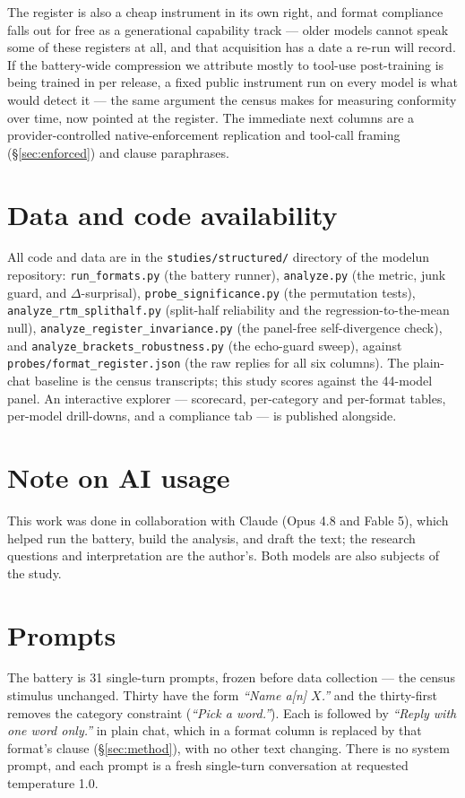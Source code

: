 \documentclass[11pt]{article}
\begin{document}
The register is also a cheap instrument in its own right, and format compliance falls out for free as a generational
capability track --- older models cannot speak some of these registers at all, and that
acquisition has a date a re-run will record. If the battery-wide compression we attribute mostly
to tool-use post-training is being trained in per release, a fixed public instrument run on
every model is what would detect it --- the same argument the census makes for measuring
conformity over time, now pointed at the register. The immediate
next columns are a provider-controlled native-enforcement replication and tool-call framing
(\S\ref{sec:enforced}) and clause paraphrases.

\section*{Data and code availability}
All code and data are in the \texttt{studies/structured/} directory of the modelun repository:
\texttt{run\_formats.py} (the battery runner), \texttt{analyze.py} (the metric, junk guard, and
$\Delta$-surprisal), \texttt{probe\_significance.py} (the permutation tests),
\texttt{analyze\_rtm\_splithalf.py} (split-half reliability and the regression-to-the-mean null),
\texttt{analyze\_register\_invariance.py} (the panel-free self-divergence check), and
\texttt{analyze\_brackets\_robustness.py} (the echo-guard sweep), against
\texttt{probes/format\_register.json} (the raw replies for all six columns). The plain-chat
baseline is the census transcripts; this study scores against the 44-model panel. An interactive
explorer --- scorecard, per-category and per-format tables, per-model drill-downs, and a
compliance tab --- is published alongside.

\section*{Note on AI usage}
This work was done in collaboration with Claude (Opus 4.8 and
Fable 5), which helped run the battery, build the analysis, and draft the text; the research
questions and interpretation are the author's. Both models are also subjects of the study.




\clearpage
\appendix
\section{Prompts}
\label{sec:prompts}
The battery is 31 single-turn prompts, frozen before data collection --- the census stimulus
unchanged. Thirty have the form \emph{``Name a[n] $X$.''} and the thirty-first removes the
category constraint (\emph{``Pick a word.''}). Each is followed by \emph{``Reply with one word
only.''} in plain chat, which in a format column is replaced by that format's clause
(\S\ref{sec:method}), with no other text changing. There is no system prompt, and each prompt is
a fresh single-turn conversation at requested temperature 1.0.
\end{document}

